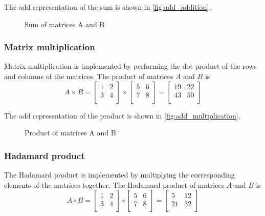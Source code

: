 The \gls{add} representation of the sum is shown in \autoref{fig:add_addition}.
\begin{figure}
    \centering
    
    \caption{Sum of matrices A and B}
    \label{fig:add_addition}
\end{figure}

\subsubsection{Matrix multiplication}
Matrix multiplication is implemented by performing the dot product of the rows and columns of the matrices.
The product of matrices $A$ and $B$ is
\[
A \times B = \begin{bmatrix}
    1 & 2 \\
    3 & 4 \\
\end{bmatrix} \times \begin{bmatrix}
    5 & 6 \\
    7 & 8 \\
\end{bmatrix} = \begin{bmatrix}
    19 & 22 \\
    43 & 50 \\
\end{bmatrix}
\]

The \gls{add} representation of the product is shown in \autoref{fig:add_multiplication}.
\begin{figure}
    \centering
    
    \caption{Product of matrices A and B}
    \label{fig:add_multiplication}
\end{figure}

\subsubsection{Hadamard product}
The Hadamard product is implemented by multiplying the corresponding elements of the matrices together.
The Hadamard product of matrices $A$ and $B$ is
\[
A \circ B = \begin{bmatrix}
    1 & 2 \\
    3 & 4 \\
\end{bmatrix} \circ \begin{bmatrix}
    5 & 6 \\
    7 & 8 \\
\end{bmatrix} = \begin{bmatrix}
    5 & 12 \\
    21 & 32 \\
\end{bmatrix}
\]

